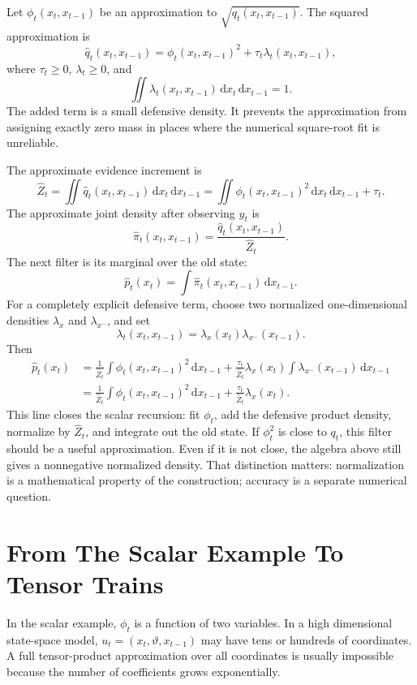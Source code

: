 \documentclass[11pt]{article}
\newcommand{\dd}{\mathrm{d}}
\theoremstyle{definition}
\theoremstyle{remark}
\begin{document}
Let \(\phi_t(x_t,x_{t-1})\) be an approximation to \(\sqrt{q_t(x_t,x_{t-1})}\).
The squared approximation is
\[
  \widehat q_t(x_t,x_{t-1})
  =
  \phi_t(x_t,x_{t-1})^2+\tau_t\lambda_t(x_t,x_{t-1}),
  \label{eq:p13-scalar-qhat}
\]
where \(\tau_t\ge0\), \(\lambda_t\ge0\), and
\[
  \iint \lambda_t(x_t,x_{t-1})\,\dd x_t\,\dd x_{t-1}=1.
\]
The added term is a small defensive density.  It prevents the approximation
from assigning exactly zero mass in places where the numerical square-root fit
is unreliable.

The approximate evidence increment is
\[
  \widehat Z_t
  =
  \iint
  \widehat q_t(x_t,x_{t-1})\,\dd x_t\,\dd x_{t-1}
  =
  \iint \phi_t(x_t,x_{t-1})^2\,\dd x_t\,\dd x_{t-1}
  +\tau_t.
  \label{eq:p13-scalar-zhat}
\]
The approximate joint density after observing \(y_t\) is
\[
  \widehat\pi_t(x_t,x_{t-1})
  =
  \frac{\widehat q_t(x_t,x_{t-1})}{\widehat Z_t}.
\]
The next filter is its marginal over the old state:
\[
  \widehat p_t(x_t)
  =
  \int
  \widehat\pi_t(x_t,x_{t-1})\,\dd x_{t-1}.
  \label{eq:p13-scalar-filter}
\]
For a completely explicit defensive term, choose two normalized one-dimensional
densities \(\lambda_x\) and \(\lambda_{x^-}\), and set
\[
  \lambda_t(x_t,x_{t-1})
  =
  \lambda_x(x_t)\lambda_{x^-}(x_{t-1}).
\]
Then
\[
\begin{aligned}
  \widehat p_t(x_t)
  &=
  \frac{1}{\widehat Z_t}
  \int \phi_t(x_t,x_{t-1})^2\,\dd x_{t-1}
  +
  \frac{\tau_t}{\widehat Z_t}
  \lambda_x(x_t)
  \int \lambda_{x^-}(x_{t-1})\,\dd x_{t-1}\\
  &=
  \frac{1}{\widehat Z_t}
  \int \phi_t(x_t,x_{t-1})^2\,\dd x_{t-1}
  +
  \frac{\tau_t}{\widehat Z_t}\lambda_x(x_t).
\end{aligned}
  \label{eq:p13-scalar-filter-decomposition}
\]
This line closes the scalar recursion: fit \(\phi_t\), add the defensive
product density, normalize by \(\widehat Z_t\), and integrate out the old
state.
If \(\phi_t^2\) is close to \(q_t\), this filter should be a useful
approximation.  Even if it is not close, the algebra above still gives a
nonnegative normalized density.  That distinction matters: normalization is a
mathematical property of the construction; accuracy is a separate numerical
question.

\section{From The Scalar Example To Tensor Trains}

In the scalar example, \(\phi_t\) is a function of two variables.  In a high
dimensional state-space model, \(u_t=(x_t,\vartheta,x_{t-1})\) may have tens or
hundreds of coordinates.  A full tensor-product approximation over all
coordinates is usually impossible because the number of coefficients grows
exponentially.
\end{document}
